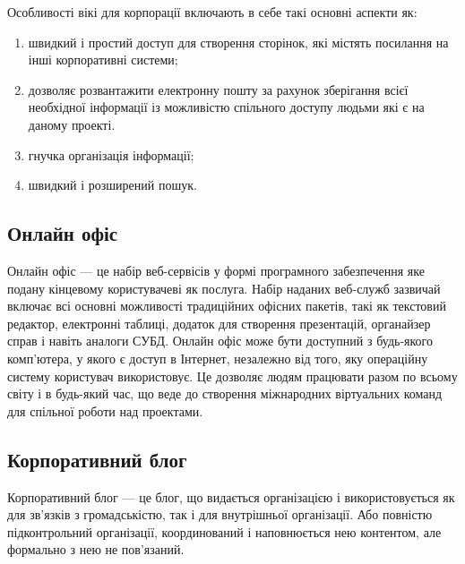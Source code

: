 \par Особливості вікі для корпорації включають в себе такі основні аспекти як:
\begin{enumerate}
\item швидкий і простий доступ для створення сторінок, які містять посилання на інші корпоративні системи;
\item дозволяє розвантажити електронну пошту за рахунок зберігання всієї необхідної інформації із можливістю спільного доступу людьми які є на даному проекті.
\item гнучка організація інформації;
\item швидкий і розширений пошук.
\end{enumerate}



\subsection{Онлайн офіс}
Онлайн офіс --- це набір веб-сервісів у формі програмного забезпечення яке подану кінцевому користувачеві як послуга. 
Набір наданих веб-служб зазвичай включає всі основні можливості традиційних офісних пакетів, такі як текстовий редактор, електронні таблиці, додаток для створення презентацій, органайзер справ і навіть аналоги СУБД. 
Онлайн офіс може бути доступний з будь-якого комп'ютера, у якого є доступ в Інтернет, незалежно від того, яку операційну систему користувач використовує. 
Це дозволяє людям працювати разом по всьому світу і в будь-який час, що веде до створення міжнародних віртуальних команд для спільної роботи над проектами. 


\subsection{Корпоративний блог}
Корпоративний блог --- це блог, що видається організацією і використовується як для зв'язків з громадськістю, так і для внутрішньої організації. 
Або повністю підконтрольний організації, координований і наповнюється нею контентом, але формально з нею не пов'язаний.



